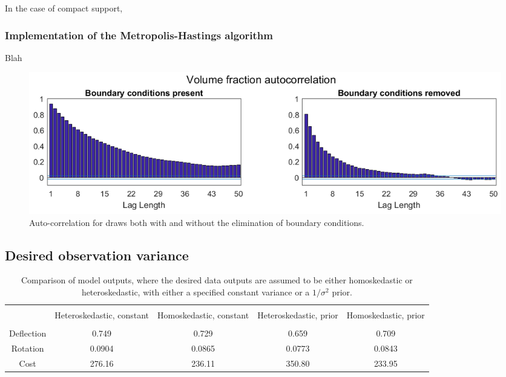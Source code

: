 \documentclass{article}
\begin{document}
In the case of compact support, 

\subsubsection{Implementation of the Metropolis-Hastings algorithm}
Blah

\begin{figure}
\centering
\includegraphics[width=.9\linewidth]{ACF_bnd_cnds_fig}
\caption{Auto-correlation for draws both with and without the elimination of boundary conditions.}
\end{figure}

\subsection{Desired observation variance}\label{des_obs_var}
\begin{table}[h]
\centering
\begin{tabular}{| c | c  |  c  | c |  c  |}
\hline
 \vspace{-3mm}
& & & & \\
& \parbox{24mm}{\centering Heteroskedastic, constant}& \parbox{24mm}{\centering Homoskedastic, constant}& \parbox{24mm}{\centering Heteroskedastic, prior} & \parbox{24mm}{\centering Homoskedastic, prior}\\
 \vspace{-3.5mm}
& & & & \\
\hline
Deflection & 0.749 & 0.729 & 0.659 & 0.709\\
Rotation & 0.0904 & 0.0865 & 0.0773 & 0.0843\\
Cost & 276.16 & 236.11 & 350.80 & 233.95 \\
\hline
\end{tabular}
\caption{Comparison of model outputs, where the desired data outputs are assumed to be either homoskedastic or heteroskedastic, with either a specified constant variance or a $1/\sigma^2$ prior.}
\label{table:obs_var_comp}
\end{table}
\end{document}
